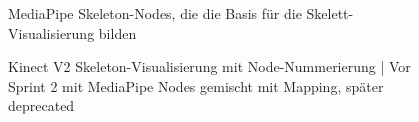 \FloatBarrier
\begin{figure}[htbp]
    \centering
    \caption{MediaPipe Skeleton-Nodes, die die Basis für die Skelett-Visualisierung bilden}
    \label{fig:mediapipe_nodes}
\end{figure}

\begin{figure}[htbp]
    \centering
    \caption{Kinect V2 Skeleton-Visualisierung mit Node-Nummerierung | Vor Sprint 2 mit MediaPipe Nodes gemischt mit Mapping, später deprecated}
    \label{fig:kinect_nodes}
\end{figure}

